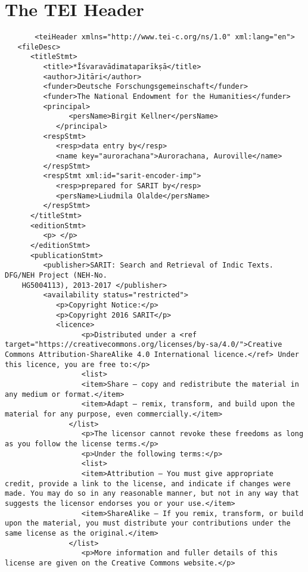 \documentclass[article,12pt,a4paper]{memoir}%
\begin{document}
	 \chapter{The TEI Header}
	 \begin{verbatim}
       <teiHeader xmlns="http://www.tei-c.org/ns/1.0" xml:lang="en">
   <fileDesc>
      <titleStmt>
         <title>*Īśvaravādimataparīkṣā</title>
         <author>Jitāri</author>
         <funder>Deutsche Forschungsgemeinschaft</funder>
         <funder>The National Endowment for the Humanities</funder>
         <principal>
	           <persName>Birgit Kellner</persName>
	        </principal>
         <respStmt>
            <resp>data entry by</resp>
            <name key="aurorachana">Aurorachana, Auroville</name>
         </respStmt>
         <respStmt xml:id="sarit-encoder-imp">
            <resp>prepared for SARIT by</resp>
            <persName>Liudmila Olalde</persName>
         </respStmt>
      </titleStmt>
      <editionStmt>
         <p> </p>
      </editionStmt>
      <publicationStmt>
         <publisher>SARIT: Search and Retrieval of Indic Texts. DFG/NEH Project (NEH-No.
	HG5004113), 2013-2017 </publisher>
         <availability status="restricted">
            <p>Copyright Notice:</p>
            <p>Copyright 2016 SARIT</p>
            <licence> 
	              <p>Distributed under a <ref target="https://creativecommons.org/licenses/by-sa/4.0/">Creative Commons Attribution-ShareAlike 4.0 International licence.</ref> Under this licence, you are free to:</p>
	              <list>
                  <item>Share — copy and redistribute the material in any medium or format.</item>
                  <item>Adapt — remix, transform, and build upon the material for any purpose, even commercially.</item>
               </list>
	              <p>The licensor cannot revoke these freedoms as long as you follow the license terms.</p>
	              <p>Under the following terms:</p>
	              <list>
                  <item>Attribution — You must give appropriate credit, provide a link to the license, and indicate if changes were made. You may do so in any reasonable manner, but not in any way that suggests the licensor endorses you or your use.</item>
                  <item>ShareAlike — If you remix, transform, or build upon the material, you must distribute your contributions under the same license as the original.</item>
               </list>
	              <p>More information and fuller details of this license are given on the Creative Commons website.</p>

\end{verbatim}
\end{document}
